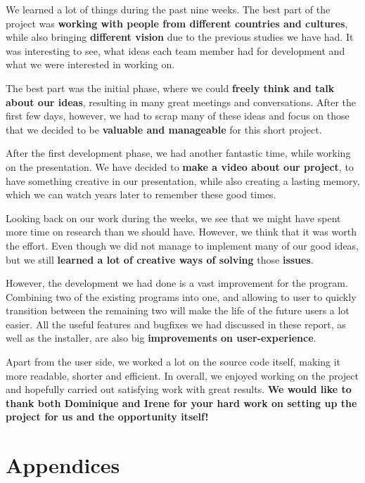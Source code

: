 \documentclass[a4paper, 11pt, article]{report}
\begin{document}
We learned a lot of things during the past nine weeks. The best part of the project was \textbf{working with people from different countries and cultures}, while also bringing \textbf{different vision} due to the previous studies we have had. It was interesting to see, what ideas each team member had for development and what we were interested in working on.

The best part was the initial phase, where we could \textbf{freely think and talk about our ideas}, resulting in many great meetings and conversations. After the first few days, however, we had to scrap many of these ideas and focus on those that we decided to be \textbf{valuable and manageable} for this short project.

After the first development phase, we had another fantastic time, while working on the presentation. We have decided to \textbf{make a video about our project}, to have something creative in our presentation, while also creating a lasting memory, which we can watch years later to remember these good times.

Looking back on our work during the weeks, we see that we might have spent more time on research than we should have. However, we think that it was worth the effort. Even though we did not manage to implement many of our good ideas, but we still \textbf{learned a lot of creative ways of solving} those \textbf{issues}.

However, the development we had done is a vast improvement for the program. Combining two of the existing programs into one, and allowing to user to quickly transition between the remaining two will make the life of the future users a lot easier. All the useful features and bugfixes we had discussed in these report, as well as the installer, are also big \textbf{improvements on user-experience}.

Apart from the user side, we worked a lot on the source code itself, making it more readable, shorter and efficient. In overall, we enjoyed working on the project and hopefully carried out satisfying work with great results. \textbf{We would like to thank both Dominique and Irene for your hard work on setting up the project for us and the opportunity itself!}


\chapter{Appendices}
\end{document}
